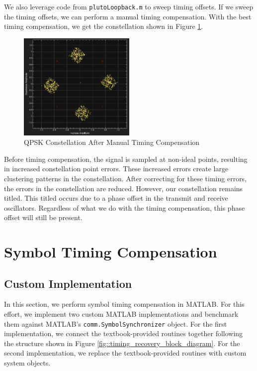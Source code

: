 \documentclass{article}
\begin{document}
\noindent We also leverage code from \texttt{plutoLoopback.m} to sweep timing offsets. If we sweep the timing offsets, we can perform a manual timing compensation. With the best timing compensation, we get the constellation shown in Figure \ref{fig::pluto_constellation_best}.

\begin{figure}[H]
	\centerline{\includegraphics[width=0.5\textwidth]{pluto_constellation_best.png}}
	\caption{QPSK Constellation After Manual Timing Compensation}
	\label{fig::pluto_constellation_best}
\end{figure}

\noindent Before timing compensation, the signal is sampled at non-ideal points, resulting in increased constellation point errors. These increased errors create large clustering patterns in the constellation. After correcting for these timing errors, the errors in the constellation are reduced. However, our constellation remains titled. This titled occurs due to a phase offset in the transmit and receive oscillators. Regardless of what we do with the timing compensation, this phase offset will still be present.

\section{Symbol Timing Compensation}

\subsection{Custom Implementation}

In this section, we perform symbol timing compensation in MATLAB. For this effort, we implement two custom MATLAB implementations and benchmark them against MATLAB's \texttt{comm.SymbolSynchronizer} object. For the first implementation, we connect the textbook-provided routines together following the structure shown in Figure \ref{fig::timing_recovery_block_diagram}. For the second implementation, we replace the textbook-provided routines with custom system objects.
\end{document}
